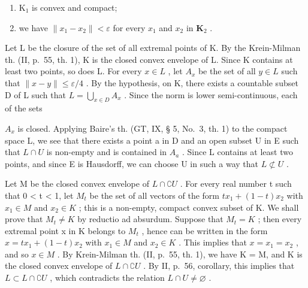 \begin{enumerate}
\def\labelenumi{\alph{enumi})}
\item
  \(\mathrm{K}_1\) is convex and compact;
\item
  we have \(\| x_1 - x_2\| < \varepsilon\) for every \(x_{1}\) and \(x_{2}\) in \(\mathbf{K}_2\) .
\end{enumerate}

Let L be the closure of the set of all extremal points of K. By the Krein-Milman th. (II, p.~55, th. 1), K is the closed convex envelope of L. Since K contains at least two points, so does L. For every \(x \in L\) , let \(A_{x}\) be the set of all \(y \in L\) such that \(\|x - y\| \leqslant \varepsilon/4\) . By the hypothesis, on K, there exists a countable subset D of L such that \(L = \bigcup_{x \in D} A_{x}\) . Since the norm is lower semi-continuous, each of the sets

\(A_{x}\) is closed. Applying Baire's th. (GT, IX, § 5, No.~3, th. 1) to the compact space L, we see that there exists a point a in D and an open subset U in E such that \(L \cap U\) is non-empty and is contained in \(A_{a}\) . Since L contains at least two points, and since E is Hausdorff, we can choose U in such a way that \(L \not\subset U\) .

Let M be the closed convex envelope of \(L \cap \complement U\) . For every real number t such that 0 \textless{} t \textless{} 1, let \(M_{t}\) be the set of all vectors of the form \(tx_{1} + (1 - t)x_{2}\) with \(x_{1} \in M\) and \(x_{2} \in K\) ; this is a non-empty, compact convex subset of K. We shall prove that \(M_{t} \neq K\) by reductio ad absurdum. Suppose that \(M_{t} = K\) ; then every extremal point x in K belongs to \(M_{t}\) , hence can be written in the form \(x = tx_{1} + (1 - t)x_{2}\) with \(x_{1} \in M\) and \(x_{2} \in K\) . This implies that \(x = x_{1} = x_{2}\) , and so \(x \in M\) . By Krein-Milman th. (II, p.~55, th. 1), we have K = M, and K is the closed convex envelope of \(L \cap \complement U\) . By II, p.~56, corollary, this implies that \(L \subset L \cap \complement U\) , which contradicts the relation \(L \cap U \neq \varnothing\) .

